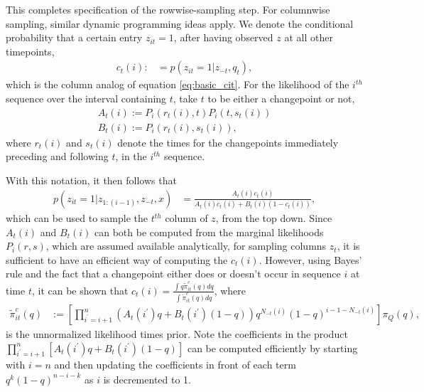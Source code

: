 This completes specification of the rowwise-sampling step. For columnwise
sampling, similar dynamic programming ideas apply. We denote the
conditional probability that a certain entry $z_{it} = 1$, after having observed
$z$ at all other timepoints,
\begin{align*}
  c_{t}\left(i\right) :&= p\left(z_{it} = 1 \vert z_{-t}, q_{t}\right),
\end{align*}
which is the column analog of equation \ref{eq:basic_cit}. For the likelihood of
the $i^{th}$ sequence over the interval containing $t$, take $t$ to be either a
changepoint or not,
\begin{align*}
  A_{t}\left(i\right) := P_{i}\left(r_{t}\left(i\right), t\right)P_{i}\left(t, s_{t}\left(i\right)\right) \\
  B_{t}\left(i\right) := P_{i}\left(r_{t}\left(i\right), s_{t}\left(i\right)\right),
\end{align*}
where $r_{t}\left(i\right)$ and $s_{t}\left(i\right)$ denote the times for the
changepoints immediately preceding and following $t$, in the $i^{th}$ sequence.

With this notation, it then follows that
\begin{align*}
  p\left(z_{it} = 1 \vert z_{1:(i - 1)}, z_{-t}, x\right) &= \frac{A_{t}\left(i\right)c_{t}\left(i\right)}{A_{t}\left(i\right)c_t\left(i\right) + B_t\left(i\right)\left(1 - c_t\left(i\right)\right)},
\end{align*}
which can be used to sample the $t^{th}$ column of $z$, from the top down. Since
$A_{t}\left(i\right)$ and $B_{t}\left(i\right)$ can both be computed from the
marginal likelihoods $P_{i}\left(r, s\right)$, which are assumed available
analytically, for sampling columns $z_t$, it is sufficient to have an efficient
way of computing the $c_{t}\left(i\right)$. However, using Bayes' rule and the
fact that a changepoint either does or doesn't occur in sequence $i$ at time
$t$, it can be shown that $c_{t}\left(i\right) = \frac{\int q
  \tilde{\pi}_{it}^{c}\left(q\right) dq}{\int \tilde{\pi}_{it}^{c}\left(q\right)
  dq}$, where
\begin{align*}
  \tilde{\pi}_{it}^{c}\left(q\right) &:= \left[\prod_{i^\prime = i + 1}^{n} \left(A_{t}\left(i^\prime\right)q + B_{t}\left(i^\prime\right)\left(1 - q\right)\right)q^{N_{-t}\left(i\right)}\left(1 - q\right)^{i - 1 - N_{-t}\left(i\right)}\right] \pi_{Q}\left(q\right),
\end{align*}
is the unnormalized likelihood times prior. Note the coefficients in the product
$\prod_{i^\prime = i + 1}^{n} \left[A_{t}\left(i^\prime\right)q +
B_{t}\left(i^\prime\right)\left(1 - q\right)\right]$ can be computed efficiently by
starting with $i = n$ and then updating the coefficients in front of each term
$q^k \left(1 - q\right)^{n - i - k}$ as $i$ is decremented to 1.

